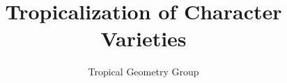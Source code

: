 \documentclass{beamer}
\begin{document}
\title{Tropicalization of Character Varieties}%
\author[TGG]{Tropical Geometry Group}%
\subject{character varieties, tropical geometry}%

\frame{\titlepage}%

%
%
%
%

\end{document}
